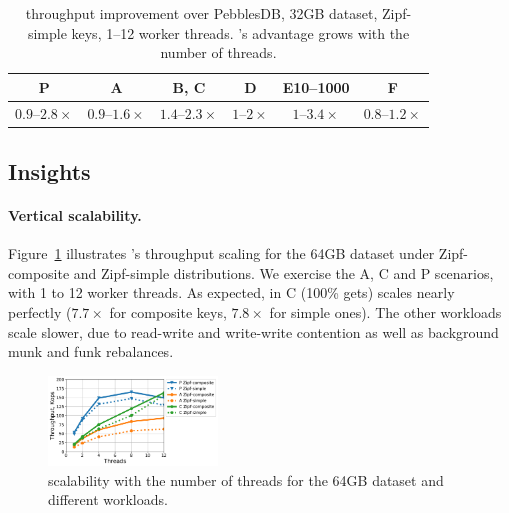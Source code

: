 \begin{table}
\centering
{\small{
\begin{tabular}{cccccc}
P & A & B, C & D& E10--1000 & F \\
\hline 
$0.9$--$2.8\times$ & $0.9$--$1.6\times$ & $1.4$--$2.3\times$ &  $1$--$2\times$ & $1$--$3.4\times$ &  $0.8$--$1.2\times$  \\
\end{tabular}
}}
\caption{{\sys\/ throughput improvement over PebblesDB, 32GB dataset, Zipf-simple keys, 1--12 worker threads.
\sys's advantage grows with the number of threads.}}
\label{fig:pebbels-throughput}
\end{table}


\subsection{Insights}
\label{ssec:drill} 

\paragraph{Vertical scalability.} 
Figure~\ref{fig:scalability} illustrates \sys's throughput scaling for the 64GB dataset under Zipf-composite and Zipf-simple  
distributions. We exercise the A, C and P scenarios, with 1 to 12 worker threads.  
As expected, in C (100\% gets) \sys\/ scales nearly perfectly ($7.7\times$ for composite keys, $7.8\times$ for simple ones). 
The other workloads scale slower, due to read-write and write-write contention as well as background munk and funk rebalances. 


\begin{figure}[th]
\centering
\includegraphics[width=0.4\textwidth]{figs/scalability_line.pdf}

\caption{{\sys\/ scalability with the number of threads for 
the 64GB dataset and different workloads. }}
\label{fig:scalability}
\end{figure}

